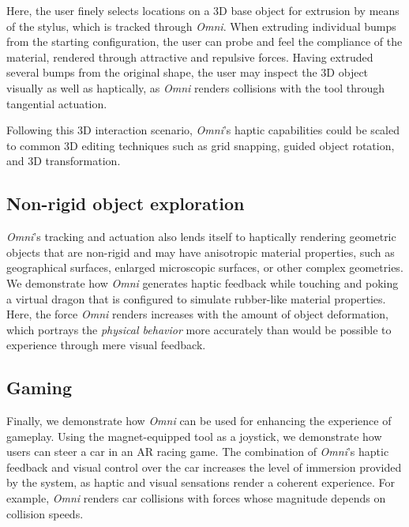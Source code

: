 Here, the user finely selects locations on a 3D base object for extrusion by means of the stylus, which is tracked through \textit{Omni}. When extruding individual bumps from the starting configuration, the user can probe and feel the compliance of the material, rendered through attractive and repulsive forces.
Having extruded several bumps from the original shape, the user may inspect the 3D object visually as well as haptically, as \textit{Omni} renders collisions with the tool through tangential actuation.

Following this 3D interaction scenario, \textit{Omni}'s haptic capabilities could be scaled to common 3D editing techniques such as grid snapping, guided object rotation, and 3D transformation.

\subsection{Non-rigid object exploration}
\textit{Omni}'s tracking and actuation also lends itself to haptically rendering geometric objects that are non-rigid and may have anisotropic material properties, such as geographical surfaces, enlarged microscopic surfaces, or other complex geometries.
We demonstrate how \textit{Omni} generates haptic feedback while touching and poking a virtual dragon that is configured to simulate rubber-like material properties.
Here, the force \textit{Omni} renders increases with the amount of object deformation, which portrays the \textit{physical behavior} more accurately than would be possible to experience through mere visual feedback.

\subsection{Gaming}
Finally, we demonstrate how \textit{Omni} can be used for enhancing the experience of gameplay.
Using the magnet-equipped tool as a joystick, we demonstrate how users can steer a car in an AR racing game.
The combination of \textit{Omni}'s haptic feedback and visual control over the car increases the level of immersion provided by the system, as haptic and visual sensations render a coherent experience.
For example, \textit{Omni} renders car collisions with forces whose magnitude depends on collision speeds.
